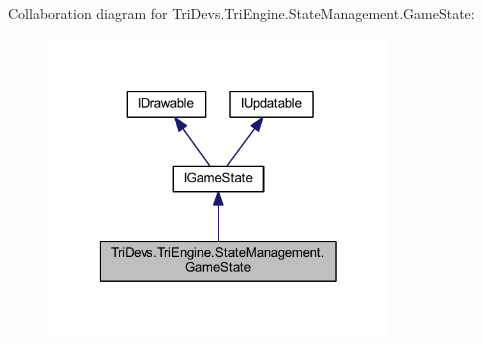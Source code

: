 Collaboration diagram for Tri\-Devs.\-Tri\-Engine.\-State\-Management.\-Game\-State\-:
\nopagebreak
\begin{figure}[H]
\begin{center}
\leavevmode
\includegraphics[width=256pt]{class_tri_devs_1_1_tri_engine_1_1_state_management_1_1_game_state__coll__graph}
\end{center}
\end{figure}
